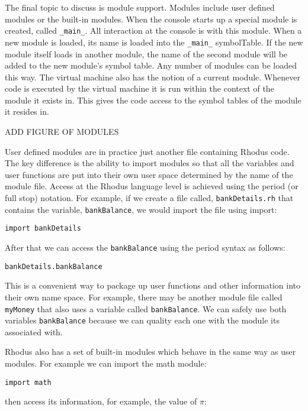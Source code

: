 The final topic to discuss is module support. Modules include user defined modules or the built-in modules. When the console starts up a special module is created, called {\tt _main_}. All interaction at the console is with this module. When a new module is loaded, its name is loaded into the {\tt _main_} symbolTable. If the new module itself loads in another module, the name of the second module will be added to the new module's symbol table. Any number of modules can be loaded this way. The virtual machine also has the notion of a current module. Whenever code is executed by the virtual machine it is run within the context of the module it exists in. This gives the code access to the symbol tables of the module it resides in.

ADD FIGURE OF MODULES

User defined modules are in practice just another file containing Rhodus code. The key difference is the ability to import modules so that all the variables and user functions are put into their own user space determined by the name of the module file. Access at the Rhodus language level is achieved using the period (or full stop) notation. For example, if we create a file called, {\tt bankDetails.rh} that contains the variable, {\tt bankBalance}, we would import the file using import:

\begin{lstlisting}
import bankDetails
\end{lstlisting}

After that we can access the {\tt bankBalance} using the period syntax as follows:

\begin{lstlisting}
bankDetails.bankBalance
\end{lstlisting}

This is a convenient way to package up user functions and other information into their own name space. For example, there may be another module file called {\tt myMoney} that also uses a variable called {\tt bankBalance}. We can safely use both variables {\tt bankBalance} because we can quality each one with the module its associated with.

Rhodus also has a set of built-in modules which behave in the same way as user modules. For example we can import the math module:

\begin{lstlisting}
import math
\end{lstlisting}

then access its information, for example, the value of $\pi$:

